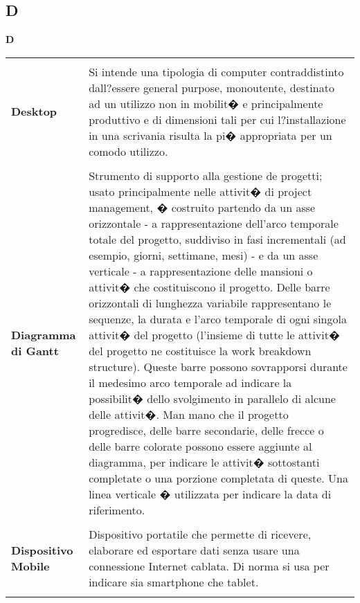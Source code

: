 {\subsection{D} 
\hfill\Huge{\textbf{D}} \\ 
\normalsize 
\begin{longtabu} to 
\toprule \\ 
\textbf{Desktop} & Si intende una tipologia di computer contraddistinto dall?essere general purpose, monoutente, destinato ad un utilizzo non in mobilit� e principalmente produttivo e di dimensioni tali per cui l?installazione in una scrivania risulta la pi� appropriata per un comodo utilizzo. \\ 
 \\ 
\textbf{Diagramma di Gantt} & Strumento di supporto alla gestione de progetti; usato principalmente nelle attivit� di project management, � costruito partendo da un asse orizzontale - a rappresentazione dell'arco temporale totale del progetto, suddiviso in fasi incrementali (ad esempio, giorni, settimane, mesi) - e da un asse verticale - a rappresentazione delle mansioni o attivit� che costituiscono il progetto. Delle barre orizzontali di lunghezza variabile rappresentano le sequenze, la durata e l'arco temporale di ogni singola attivit� del progetto (l'insieme di tutte le attivit� del progetto ne costituisce la work breakdown structure). Queste barre possono sovrapporsi durante il medesimo arco temporale ad indicare la possibilit� dello svolgimento in parallelo di alcune delle attivit�. Man mano che il progetto progredisce, delle barre secondarie, delle frecce o delle barre colorate possono essere aggiunte al diagramma, per indicare le attivit� sottostanti completate o una porzione completata di queste. Una linea verticale � utilizzata per indicare la data di riferimento. \\ 
 \\ 
\textbf{Dispositivo Mobile} & Dispositivo portatile che permette di ricevere, elaborare ed esportare dati senza usare una connessione Internet cablata. Di norma si usa per indicare sia smartphone che tablet. \\ 
 \\ 
\end{longtabu} 
\newpage 
}

